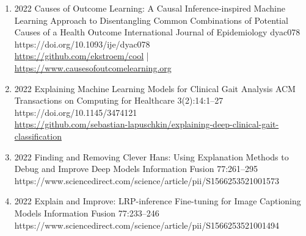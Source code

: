 {\begin{enumerate}
    \item {}
                        {2022}
                        {Causes of Outcome Learning: A Causal Inference-inspired Machine Learning Approach to Disentangling Common Combinations of Potential Causes of a Health Outcome}
                        {International Journal of Epidemiology}
                        {dyac078}
                        {https://doi.org/10.1093/ije/dyac078}
                        {\\\href{https://github.com/ekstroem/cool}{https://github.com/ekstroem/cool} | 
                         \href{https://www.causesofoutcomelearning.org}{https://www.causesofoutcomelearning.org}
                        }

    \item {}
                        {2022}
                        {Explaining Machine Learning Models for Clinical Gait Analysis}
                        {ACM Transactions on Computing for Healthcare}
                        {3(2):14:1--27}
                        {https://doi.org/10.1145/3474121}
                        {\\\href{https://github.com/sebastian-lapuschkin/explaining-deep-clinical-gait-classification}{https://github.com/sebastian-lapuschkin/explaining-deep-clinical-gait-classification}}


    \item {}
                        {2022}
                        {Finding and Removing Clever Hans: Using Explanation Methods to Debug and Improve Deep Models}
                        {Information Fusion}
                        {77:261--295}
                        {https://www.sciencedirect.com/science/article/pii/S1566253521001573}


    \item {}
                       {2022}
                       {Explain and Improve: LRP-inference Fine-tuning for Image Captioning Models}
                       {Information Fusion}
                       {77:233--246}
                       {https://www.sciencedirect.com/science/article/pii/S1566253521001494}


\end{enumerate}}
